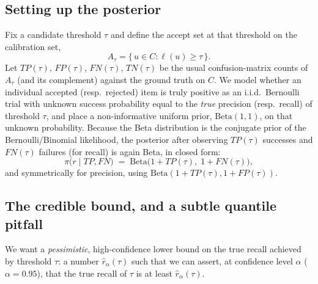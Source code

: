 \subsection{Setting up the posterior}
Fix a candidate threshold $\tau$ and define the accept set at that
threshold on the calibration set,
\[
  A_\tau = \{\, u \in C : \ell(u) \ge \tau \,\}.
\]
Let $\mathit{TP}(\tau)$, $\mathit{FP}(\tau)$, $\mathit{FN}(\tau)$,
$\mathit{TN}(\tau)$ be the usual confusion-matrix counts of $A_\tau$
(and its complement) against the ground truth on $C$. We model whether
an individual accepted (resp.\ rejected) item is truly positive as an
i.i.d.\ Bernoulli trial with unknown success probability equal to the
\emph{true} precision (resp.\ recall) of threshold $\tau$, and place a
non-informative uniform prior, $\mathrm{Beta}(1,1)$, on that unknown
probability. Because the Beta distribution is the conjugate prior of
the Bernoulli/Binomial likelihood, the posterior after observing
$\mathit{TP}(\tau)$ successes and $\mathit{FN}(\tau)$ failures (for
recall) is again Beta, in closed form:
\[
  \pi\bigl(r \mid \mathit{TP}, \mathit{FN}\bigr)
  \;=\; \mathrm{Beta}\bigl(1 + \mathit{TP}(\tau),\; 1 + \mathit{FN}(\tau)\bigr),
\]
and symmetrically for precision, using $\mathrm{Beta}(1+\mathit{TP}(\tau),
1+\mathit{FP}(\tau))$.

\subsection{The credible bound, and a subtle quantile pitfall}
\label{sec:quantile-pitfall}
We want a \emph{pessimistic}, high-confidence lower bound on the true
recall achieved by threshold $\tau$: a number $\widehat{r}_\alpha(\tau)$
such that we can assert, at confidence level $\alpha$ (\eg $\alpha=0.95$),
that the true recall of $\tau$ is at least $\widehat{r}_\alpha(\tau)$.

